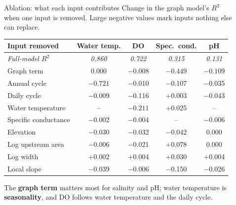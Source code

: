 \documentclass[final]{beamer}
\newlength{\sepwidth}
\newlength{\colwidth}
\newcommand{\separatorcolumn}{\begin{column}{\sepwidth}\end{column}}
\begin{document}
\begin{frame}[t]
\begin{columns}[t]
\begin{column}{\colwidth}
  \begin{block}{Ablation: what each input contributes}
    Change in the graph model's $R^2$ when one input is removed. Large negative values mark
    inputs nothing else can replace.
    \begin{table}
      \centering
      \begin{tabular}{l c c c c}
        \toprule
        \textbf{Input removed} & \textbf{Water temp.} & \textbf{DO} & \textbf{Spec.\ cond.} & \textbf{pH} \\
        \midrule
        \emph{Full-model $R^2$} & \emph{0.860} & \emph{0.722} & \emph{0.315} & \emph{0.131} \\
        \midrule
        Graph term           & 0.000      & $-$0.008 & $\mathbf{-0.449}$ & $\mathbf{-0.109}$ \\
        Annual cycle         & $\mathbf{-0.721}$ & $-$0.010 & $-$0.107 & $-$0.035 \\
        Daily cycle          & $-$0.009   & $-$0.116 & $+$0.003 & $-$0.043 \\
        Water temperature    & --         & $\mathbf{-0.211}$ & $+$0.025 & -- \\
        Specific conductance & $-$0.002   & $-$0.004 & --       & $-$0.006 \\
        Elevation            & $-$0.030   & $-$0.032 & $-$0.042 & 0.000 \\
        Log upstream area    & $-$0.006   & $-$0.021 & $+$0.078 & 0.000 \\
        Log width            & $+$0.002   & $+$0.004 & $+$0.030 & $+$0.004 \\
        Local slope          & $-$0.039   & $-$0.006 & $-$0.150 & $-$0.026 \\
        \bottomrule
      \end{tabular}
    \end{table}
    The \textbf{graph term} matters most for salinity and pH; water temperature is
    \textbf{seasonality}, and DO follows water temperature and the daily cycle.
  \end{block}

\end{column}

\separatorcolumn

\begin{column}{\colwidth}


\end{column}
\end{columns}
\end{frame}
\end{document}
